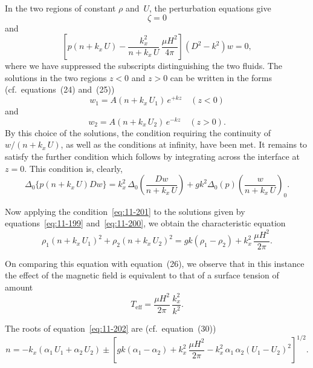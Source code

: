 In the two regions of constant $\rho$ and~$U$, the perturbation equations give
\begin{equation}
\label{eq:11-197}
\zeta = 0
\end{equation}
and
\begin{equation}
\label{eq:11-198}
\left[p(n+k_x\,U) - \frac{k_x^{2}}{n+k_x\,U}\,
\frac{\mu H^{2}}{4\pi}\right](D^{2}-k^{2})w = 0,
\end{equation}
where we have suppressed the subscripts distinguishing the two fluids.
The solutions in the two regions $z<0$ and $z>0$ can be written in the
forms (cf.\ equations~(24) and~(25))
\begin{equation}
\label{eq:11-199}
w_1 = A(n+k_x\,U_1)\,e^{+kz}\quad (z<0)
\end{equation}
and
\begin{equation}
\label{eq:11-200}
w_2 = A(n+k_x\,U_2)\,e^{-kz}\quad (z>0).
\end{equation}
By this choice of the solutions, the condition requiring the continuity
of $w/(n+k_x\,U)$, as well as the conditions at infinity, have been met.
It remains to satisfy the further condition which follows by integrating
across the interface at $z=0$.  This condition is, clearly,
\begin{equation}
\label{eq:11-201}
\Delta_0\!\bigl\{p(n+k_x\,U)Dw\bigr\}
= k_x^{2}\,\Delta_0\!\!\left(\frac{Dw}{n+k_x\,U}\right)
  + gk^{2}\Delta_0(p)\!\left(\frac{w}{n+k_x\,U}\right)_{\!0}.
\end{equation}

Now applying the condition~\eqref{eq:11-201} to the solutions given by
equations~\eqref{eq:11-199} and~\eqref{eq:11-200}, we obtain the
characteristic equation
\begin{equation}
\label{eq:11-202}
\rho_1(n+k_x\,U_1)^{2}+\rho_2(n+k_x\,U_2)^{2}
= gk(\rho_1-\rho_2)+k_x^{2}\,\frac{\mu H^{2}}{2\pi}.
\end{equation}

On comparing this equation with equation~(26), we observe that in this
instance the effect of the magnetic field is equivalent to that of a
surface tension of amount
\begin{equation}
\label{eq:11-203}
T_{\text{eff}} = \frac{\mu H^{2}}{2\pi}\,\frac{k_x^{2}}{k^{2}}.
\end{equation}

The roots of equation~\eqref{eq:11-202} are (cf.\ equation~(30))
\begin{equation}
\label{eq:11-204}
n = -k_x(\alpha_1\,U_1 + \alpha_2\,U_2) \pm
\left[gk(\alpha_1-\alpha_2) + k_x^{2}\,\frac{\mu H^{2}}{2\pi}
  - k_x^{2}\,\alpha_1\,\alpha_2(U_1-U_2)^{2}\right]^{1/2}\!.
\end{equation}

